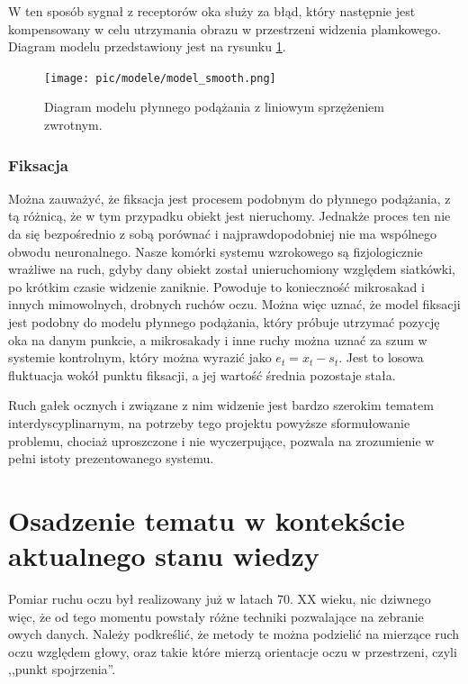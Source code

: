\documentclass[a4paper,twoside,12pt]{book}
\begin{document}
W ten sposób sygnał z receptorów oka służy za błąd, który następnie jest kompensowany w celu utrzymania obrazu w przestrzeni widzenia plamkowego. Diagram modelu przedstawiony jest na rysunku \ref{fig:model-smooth}.

\begin{figure}[htbp]
	\centering
	\texttt{[image: pic/modele/model\_smooth.png]}
	\caption{Diagram modelu płynnego podążania z liniowym sprzężeniem zwrotnym.}
	\label{fig:model-smooth}
\end{figure}

\subsubsection{Fiksacja}
\label{subsubsec:fiksacja}

Można zauważyć, że fiksacja jest procesem podobnym do płynnego podążania, z tą różnicą, że w tym przypadku obiekt jest nieruchomy. Jednakże proces ten nie da się bezpośrednio z sobą porównać i najprawdopodobniej nie ma wspólnego obwodu neuronalnego. Nasze komórki systemu wzrokowego są fizjologicznie wrażliwe na ruch, gdyby dany obiekt został unieruchomiony względem siatkówki, po krótkim czasie widzenie zaniknie. Powoduje to konieczność mikrosakad i innych mimowolnych, drobnych ruchów oczu. Można więc uznać, że model fiksacji jest podobny do modelu płynnego podążania, który próbuje utrzymać pozycję oka na danym punkcie, a mikrosakady i inne ruchy można uznać za szum w systemie kontrolnym, który można wyrazić jako $e_t = x_t - s_t$. Jest to losowa fluktuacja wokół punktu fiksacji, a jej wartość średnia pozostaje stała.

Ruch gałek ocznych i związane z nim widzenie jest bardzo szerokim tematem interdyscyplinarnym, na potrzeby tego projektu powyższe sformułowanie problemu, chociaż uproszczone i nie wyczerpujące, pozwala na zrozumienie w pełni istoty prezentowanego systemu.


\section{Osadzenie tematu w kontekście aktualnego stanu wiedzy}
\label{sec:osadzenie-tematu-w-kontekscie-aktualnego-stanu-wiedzy}

Pomiar ruchu oczu był realizowany już w latach 70. XX wieku, nic dziwnego więc, że od tego momentu powstały różne techniki pozwalające na zebranie owych danych. Należy podkreślić, że metody te można podzielić na mierzące ruch oczu względem głowy, oraz takie które mierzą orientacje oczu w przestrzeni, czyli ,,punkt spojrzenia''. 
\end{document}
